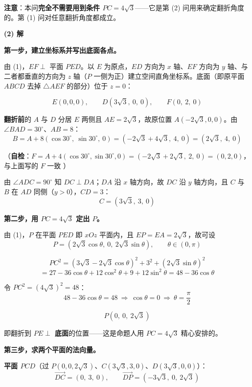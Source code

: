 \begin{gktip}
\textbf{注意}：本问\textbf{完全不需要用到条件 $PC=4\sqrt3$}——它是第 (2) 问用来确定翻折角度的。第 (1) 问对任意翻折角度都成立。
\end{gktip}

\par\medskip

\textbf{(2) 解}

\textbf{第一步，建立坐标系并写出底面各点。}

由 (1)，$EF\perp$ 平面 $PED$。以 $E$ 为原点，$ED$ 方向为 $x$ 轴、$EF$ 方向为 $y$ 轴、与二者都垂直的方向为 $z$ 轴（$P$ 一侧为正）建立空间直角坐标系。底面（即原平面 $ABCD$ 去掉 $\triangle AEF$ 的部分）位于 $z=0$：

\[E(0,0,0),\qquad D\left(3\sqrt3,\ 0,\ 0\right),\qquad F(0,\ 2,\ 0)\]

\textbf{翻折前}的 $A$ 与 $D$ 分居 $E$ 两侧且 $AE=2\sqrt3$，故原位置 $A\left(-2\sqrt3,0,0\right)$。由 $\angle BAD=30^{\circ}$、$AB=8$：
\[B=A+8\left(\cos30^{\circ},\ \sin30^{\circ},\ 0\right)=\left(-2\sqrt3+4\sqrt3,\ 4,\ 0\right)=\left(2\sqrt3,\ 4,\ 0\right)\]

（\textbf{自检}：$F=A+4\left(\cos30^{\circ},\sin30^{\circ},0\right)=\left(-2\sqrt3+2\sqrt3,\ 2,\ 0\right)=(0,2,0)$，与上面写的 $F$ 一致 ）

由 $\angle ADC=90^{\circ}$ 知 $DC\perp DA$；$DA$ 沿 $x$ 轴方向，故 $DC$ 沿 $y$ 轴方向，且 $C$ 与 $B$ 在 $AD$ 同侧（$y>0$），$CD=3$：
\[C=\left(3\sqrt3,\ 3,\ 0\right)\]

\textbf{第二步，用 $PC=4\sqrt3$ 定出 $P$。}

由 (1)，$P$ 在平面 $PED$ 即 $xOz$ 平面内，且 $EP=EA=2\sqrt3$，故可设
\[P=\left(2\sqrt3\cos\theta,\ 0,\ 2\sqrt3\sin\theta\right),\qquad\theta\in(0,\pi)\]

\[PC^{2}=\left(3\sqrt3-2\sqrt3\cos\theta\right)^{2}+3^{2}+\left(2\sqrt3\sin\theta\right)^{2}\]
\[=27-36\cos\theta+12\cos^{2}\theta+9+12\sin^{2}\theta=48-36\cos\theta\]

令 $PC^{2}=\left(4\sqrt3\right)^{2}=48$：
\[48-36\cos\theta=48\ \Longrightarrow\ \cos\theta=0\ \Longrightarrow\ \theta=\frac\pi2\]

\[\boxed{P\left(0,\ 0,\ 2\sqrt3\right)}\]

即翻折到 \textbf{$PE\perp$ 底面}的位置——这是命题人用 $PC=4\sqrt3$ 精心安排的。

\textbf{第三步，求两个平面的法向量。}

\textbf{平面 $PCD$}（过 $P(0,0,2\sqrt3)$、$C\left(3\sqrt3,3,0\right)$、$D\left(3\sqrt3,0,0\right)$）：
\[\overrightarrow{DC}=(0,\ 3,\ 0),\qquad\overrightarrow{DP}=\left(-3\sqrt3,\ 0,\ 2\sqrt3\right)\]

